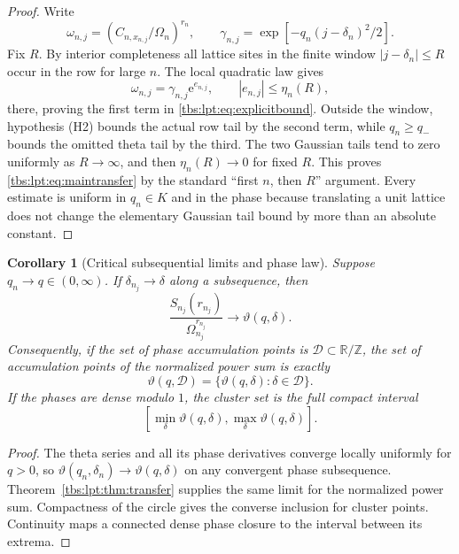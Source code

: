 \documentclass[11pt,a4paper]{article}
\numberwithin{equation}{section}
\newtheorem{corollary}[theorem]{Corollary}
\theoremstyle{definition}
\newcommand{\Z}{\mathbb Z}
\newcommand{\R}{\mathbb R}
\newcommand{\ee}{\mathrm e}
\begin{document}
\begin{proof}
Write
\[
 \omega_{n,j}=\left(C_{n,x_{n,j}}/\Omega_n\right)^{r_n},\qquad
 \gamma_{n,j}=\exp[-q_n(j-\delta_n)^2/2].
\]
Fix $R$. By interior completeness all lattice sites in the finite window
$|j-\delta_n|\le R$ occur in the row for large $n$. The local quadratic
law gives
\[
 \omega_{n,j}=\gamma_{n,j}\ee^{e_{n,j}},\qquad |e_{n,j}|\le\eta_n(R),
\]
there, proving the first term in \eqref{tbs:lpt:eq:explicitbound}.
Outside the window, hypothesis (H2) bounds the actual row tail by the
second term, while $q_n\ge q_-$ bounds the omitted theta tail by the
third. The two Gaussian tails tend to zero uniformly as $R\to\infty$, and
then $\eta_n(R)\to0$ for fixed $R$. This proves
\eqref{tbs:lpt:eq:maintransfer} by the standard ``first $n$, then $R$''
argument. Every estimate is uniform in $q_n\in K$ and in the phase
because translating a unit lattice does not change the elementary
Gaussian tail bound by more than an absolute constant.
\end{proof}

\begin{corollary}[Critical subsequential limits and phase law]\label{tbs:lpt:cor:clusters}
Suppose $q_n\to q\in(0,\infty)$. If $\delta_{n_j}\to\delta$ along a
subsequence, then
\begin{equation}\label{tbs:lpt:eq:subseq}
 \frac{S_{n_j}(r_{n_j})}{\Omega_{n_j}^{r_{n_j}}}
 \longrightarrow\vartheta(q,\delta).
\end{equation}
Consequently, if the set of phase accumulation points is
$\mathcal D\subset\R/\Z$, the set of accumulation points of the
normalized power sum is exactly
\begin{equation}\label{tbs:lpt:eq:cluster-set}
 \vartheta(q,\mathcal D)=\{\vartheta(q,\delta):\delta\in\mathcal D\}.
\end{equation}
If the phases are dense modulo $1$, the cluster set is the full compact
interval
\[
 [\min_\delta\vartheta(q,\delta),\max_\delta\vartheta(q,\delta)].
\]
\end{corollary}

\begin{proof}
The theta series and all its phase derivatives converge locally uniformly
for $q>0$, so $\vartheta(q_n,\delta_n)\to\vartheta(q,\delta)$ on any
convergent phase subsequence. Theorem~\ref{tbs:lpt:thm:transfer} supplies
the same limit for the normalized power sum. Compactness of the circle
gives the converse inclusion for cluster points. Continuity maps a
connected dense phase closure to the interval between its extrema.
\end{proof}
\end{document}
